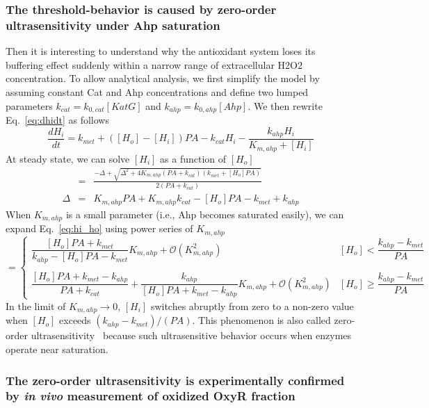 \documentclass[10pt]{article}
\begin{document}
\subsubsection{The threshold-behavior is caused by zero-order ultrasensitivity under Ahp saturation}

Then it is interesting to understand why the antioxidant system loses its buffering effect suddenly within a narrow range of extracellular H2O2 concentration. To allow analytical analysis, we first simplify the model by assuming constant Cat and Ahp concentrations and define two lumped parameters $k_{cat}=k_{0,cat}[KatG]$ and $k_{ahp}=k_{0,ahp}[Ahp]$. We then rewrite Eq.~\ref{eq:dhidt} as follows
\begin{equation}
\frac{dH_i}{dt} = k_{met}+([H_o]-[H_i])PA -k_{cat}H_i- \dfrac{k_{ahp}H_i}{K_{m,ahp}+[H_i]}
\end{equation}
 At steady state, we can solve $[H_i]$ as a function of $[H_o]$
\begin{eqnarray}
[H_i] &=& \frac{-\Delta +\sqrt{\Delta^2+4K_{m,ahp}(PA+k_{cat})(k_{met}+[H_o]PA)}}{2(PA+k_{cat})}  \label{eq:hi_ho}\\
\Delta &=& K_{m,ahp}PA+K_{m,ahp}k_{cat}-[H_o]PA-k_{met}+k_{ahp}
\end{eqnarray}
When $K_{m,ahp}$ is a small parameter (i.e., Ahp becomes saturated easily), we can expand Eq.~\ref{eq:hi_ho} using power series of $K_{m,ahp}$
\begin{equation*}
[H_i] = \begin{cases}
\dfrac{[H_o]PA+k_{met}}{k_{ahp}-[H_o]PA-k_{met}}K_{m,ahp} + \mathcal{O}(K_{m,ahp}^2) & \text{$[H_o]<\dfrac{k_{ahp}-k_{met}}{PA}$}\\
\\
\dfrac{[H_o]PA+k_{met}-k_{ahp}}{PA+k_{cat}} + \dfrac{k_{ahp}}{[H_o]PA+k_{met}-k_{ahp}}K_{m,ahp} + \mathcal{O}(K_{m,ahp}^2) &  \text{$[H_o]\ge\dfrac{k_{ahp}-k_{met}}{PA}$}
\end{cases}
\end{equation*}
In the limit of $K_{m,ahp}\to0$, $[H_i]$ switches abruptly from zero to a non-zero value when $[H_o]$ exceeds $(k_{ahp}-k_{met})/(PA)$. This phenomenon is also called zero-order ultrasensitivity~\cite{ferrell2014ultrasensitivity} because such ultrasensitive behavior occurs when enzymes operate near saturation.

\subsubsection{The zero-order ultrasensitivity is experimentally confirmed by \textit{in vivo} measurement of oxidized OxyR fraction}
\label{eq:the_zeroorder_ultrasensivity}
\end{document}
